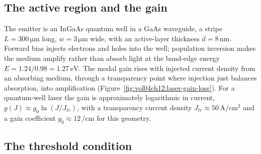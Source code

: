\subsection{The active region and the gain}

The emitter is an InGaAs quantum well in a GaAs waveguide, a stripe
$L = 300\,\si{\micro\meter}$ long, $w = 3\,\si{\micro\meter}$ wide, with
an active-layer thickness $d = 8\,\si{\nano\meter}$. Forward bias
injects electrons and holes into the well; population inversion makes
the medium amplify rather than absorb light at the band-edge energy
$E = 1.24/0.98 = 1.27\,\si{\electronvolt}$. The modal gain rises with
injected current density from an absorbing medium, through a
transparency point where injection just balances absorption, into
amplification (Figure~\ref{fig:vol04ch12:laser-gain-loss}). For a
quantum-well laser the gain is approximately logarithmic in current,
$g(J) \approx g_0\ln(J/J_{tr})$, with a transparency current density
$J_{tr} \approx 50\,\si{\ampere\per\centi\meter\squared}$ and a gain
coefficient $g_0 \approx 12\,\si{\per\centi\meter}$ for this geometry.



\subsection{The threshold condition}

